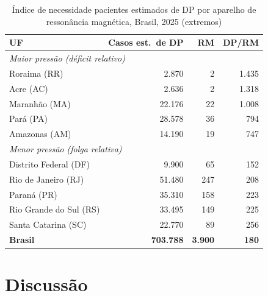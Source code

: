 \documentclass[12pt,a4paper,oneside]{article}
\begin{document}
\begin{table}[htbp]
\centering
\caption{Índice de necessidade \textendash{} pacientes estimados de DP
por aparelho de ressonância magnética, Brasil, 2025 (extremos)}
\begin{tabular}{lrrr}
\toprule
\textbf{UF} & \textbf{Casos est.\ de DP} & \textbf{RM} & \textbf{DP/RM} \\
\midrule
\multicolumn{4}{l}{\textit{Maior pressão (déficit relativo)}} \\
Roraima (RR)          & 2.870  & 2   & 1.435 \\
Acre (AC)             & 2.636  & 2   & 1.318 \\
Maranhão (MA)         & 22.176 & 22  & 1.008 \\
Pará (PA)             & 28.578 & 36  &   794 \\
Amazonas (AM)         & 14.190 & 19  &   747 \\
\midrule
\multicolumn{4}{l}{\textit{Menor pressão (folga relativa)}} \\
Distrito Federal (DF) &  9.900 &  65 &   152 \\
Rio de Janeiro (RJ)   & 51.480 & 247 &   208 \\
Paraná (PR)           & 35.310 & 158 &   223 \\
Rio Grande do Sul (RS)& 33.495 & 149 &   225 \\
Santa Catarina (SC)   & 22.770 &  89 &   256 \\
\midrule
\textbf{Brasil}       & \textbf{703.788} & \textbf{3.900} & \textbf{180} \\
\bottomrule
\end{tabular}
\par{}
\label{tab:necessidade}
\end{table}

\section{Discussão}
\end{document}
